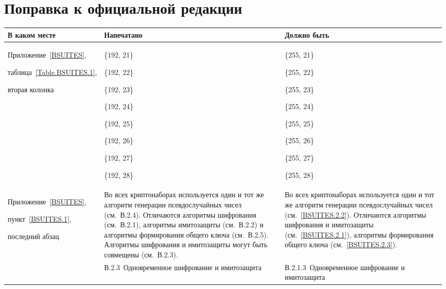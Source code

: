 \clearpage
\chapter*{\mbox{}\hfill Поправка к официальной редакции\hfill\mbox{}}

\mbox{}

\begin{center}
\begin{tabular}{|p{3.5cm}|p{6cm}|p{6cm}|}
\hline
В каком месте & Напечатано & Должно быть\\
\hline
\hline
Приложение~\ref{BSUITES},\par
таблица~\ref{Table.BSUITES.1},\par
вторая колонка
&
\{192, 21\}\par
\{192, 22\}\par
\{192, 23\}\par
\{192, 24\}\par
\{192, 25\}\par
\{192, 26\}\par
\{192, 27\}\par
\{192, 28\}
&
\{255, 21\}\par
\{255, 22\}\par
\{255, 23\}\par
\{255, 24\}\par
\{255, 25\}\par
\{255, 26\}\par
\{255, 27\}\par
\{255, 28\}
\\
\hline
Приложение~\ref{BSUITES},\par
пункт~\ref{BSUITES.1},\par
последний абзац
&
Во всех криптонаборах используется один и тот же алгоритм генерации
псевдослучайных чисел (см.~В.2.4). Отличаются алгоритмы шифрования (см.~В.2.1),
алгоритмы имитозащиты (см.~В.2.2) и алгоритмы формирования общего ключа
(см.~В.2.5). Алгоритмы шифрования и имитозащиты могут быть совмещены
(см.~В.2.3).
&
Во всех криптонаборах используется один и тот же алгоритм генерации
псевдослучайных чисел (см.~\ref{BSUITES.2.2}). Отличаются алгоритмы шифрования и
имитозащиты (см.~\ref{BSUITES.2.1}), алгоритмы формирования общего ключа
(см.~\ref{BSUITES.2.3}).
\\
\hline
{}
&
В.2.3~Одновременное шифрование и имитозащита
&
В.2.1.3~Одновременное шифрование и имитозащита

\end{tabular}
\end{center}
